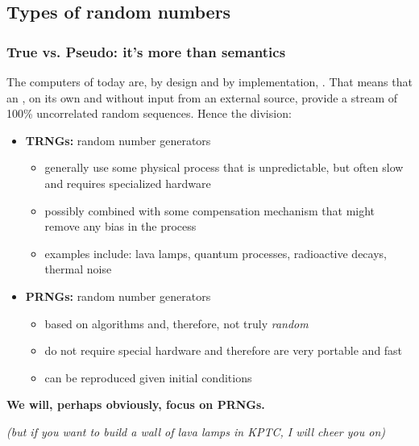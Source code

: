 \documentclass[hyperref={colorlinks=true}]{beamer}
\begin{document}
\subsection[Types of random numbers]{Types of random numbers}

\begin{frame}%
  \frametitle{True vs. Pseudo: it's more than semantics}
  
  The computers of today are, by design and by implementation, .  That means that an , on its own and without input from an external source, provide a stream of 100\% uncorrelated random sequences. Hence the division:
  
  \begin{itemize}
    \item \textbf{TRNGs:}  random number generators
    \begin{itemize}
      \item generally use some physical process that is unpredictable, but often slow and requires specialized hardware
      \item possibly combined with some compensation mechanism that might remove any bias in the process
      \item examples include: lava lamps, quantum processes, radioactive decays, thermal noise
    \end{itemize}
    \item \textbf{PRNGs:} random number generators
    \begin{itemize}
      \item based on algorithms and, therefore, not truly \textit{random}
      \item do not require special hardware and therefore are very portable and fast
      \item can be reproduced given initial conditions
    \end{itemize}
  \end{itemize}
  
  \centering \textbf{We will, perhaps obviously, focus on PRNGs.} 
  
  \textit{(but if you want to build a wall of lava lamps in KPTC, I will cheer you on)}

\end{frame}
\end{document}
